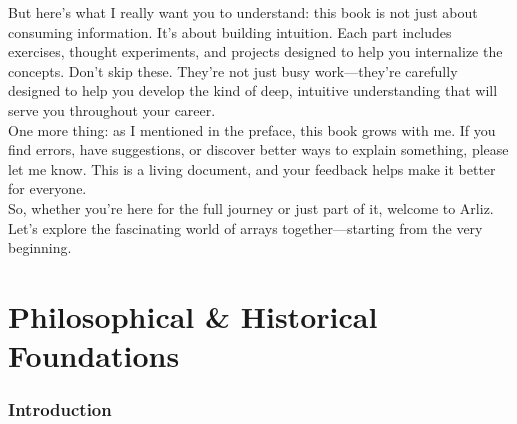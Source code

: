 \documentclass[12pt, oneside, openany]{book}
\begin{document}
But here's what I really want you to understand: this book is not just about consuming information. It's about building intuition. Each part includes exercises, thought experiments, and projects designed to help you internalize the concepts. Don't skip these. They're not just busy work—they're carefully designed to help you develop the kind of deep, intuitive understanding that will serve you throughout your career.\\
One more thing: as I mentioned in the preface, this book grows with me. If you find errors, have suggestions, or discover better ways to explain something, please let me know. This is a living document, and your feedback helps make it better for everyone.\\
So, whether you're here for the full journey or just part of it, welcome to Arliz. Let's explore the fascinating world of arrays together—starting from the very beginning.\\


\part{Philosophical \& Historical Foundations}

\section*{Introduction}
\end{document}
